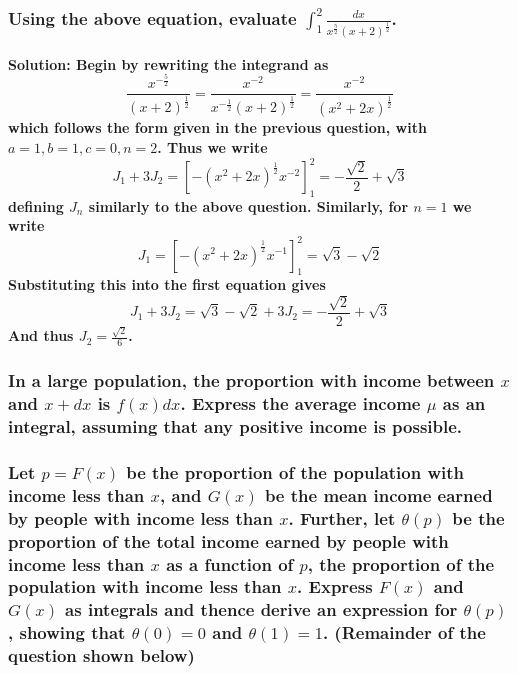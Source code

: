 \documentclass{article}
\begin{document}
\hrulefill
\subsubsection*{Using the above equation, evaluate $\int_{1}^{2}\frac{dx}{x^{\frac{5}{2}}(x+2)^{\frac{1}{2}}}$.}
\bf Solution:
\normalfont
Begin by rewriting the integrand as 
\begin{equation*}
    \frac{x^{-\frac{5}{2}}}{(x+2)^{\frac{1}{2}}} = \frac{x^{-2}}{x^{-\frac{1}{2}}(x+2)^{\frac{1}{2}}} = \frac{x^{-2}}{(x^2+2x)^{\frac{1}{2}}}
\end{equation*}
which follows the form given in the previous question, with $a=1, b=1, c=0, n=2$. Thus we write
\begin{equation*}
    J_{1} + 3J_2 = [-(x^2+2x)^{\frac{1}{2}}x^{-2}]^{2}_{1} = -\frac{\sqrt{2}}{2} + \sqrt{3}
\end{equation*}
defining $J_n$ similarly to the above question. Similarly, for $n=1$ we write
\begin{equation*}
    J_1 = [-(x^2+2x)^{\frac{1}{2}}x^{-1}]^{2}_{1} = \sqrt{3} - \sqrt{2}
\end{equation*}
Substituting this into the first equation gives
\begin{equation*}
    J_{1} + 3J_2 = \sqrt{3} - \sqrt{2} + 3J_2 = -\frac{\sqrt{2}}{2} + \sqrt{3}
\end{equation*}
And thus $J_2 = \frac{\sqrt{2}}{6}$.

\hrulefill

\subsubsection*{In a large population, the proportion with income between $x$ and $x + dx$ is $f(x)dx$. Express the average income $\mu$ as an integral, assuming that any positive income is possible.
\\
\\
Let $p=F(x)$ be the proportion of the population with income less than $x$, and $G(x)$ be the mean income earned by people
with income less than $x$. Further, let $\theta(p)$ be the proportion of the total income earned by people with income less than $x$ as a function of $p$, the proportion of the population with income less than $x$.
Express $F(x)$ and $G(x)$ as integrals and thence derive an expression for $\theta(p)$, showing that $\theta(0)=0$ and $\theta(1)=1$. (Remainder of the question shown below)}
\end{document}
